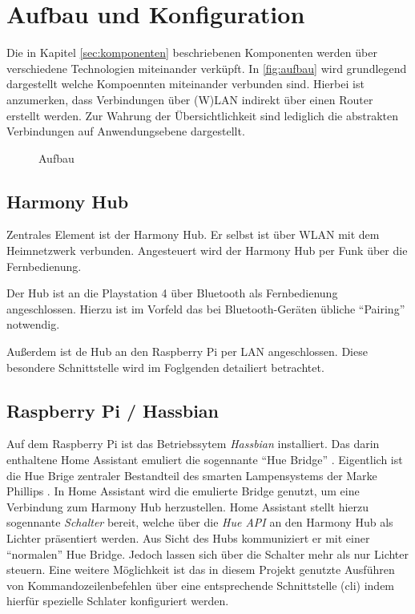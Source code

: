 \newpage
\section{Aufbau und Konfiguration}\label{sec:aufbau}
Die in Kapitel \ref{sec:komponenten} \textit{} beschriebenen Komponenten werden über verschiedene Technologien miteinander verküpft.
In \autoref{fig:aufbau} wird grundlegend dargestellt welche Kompoennten miteinander verbunden sind.
Hierbei ist anzumerken, dass Verbindungen über (W)LAN indirekt über einen Router erstellt werden.
Zur Wahrung der Übersichtlichkeit sind lediglich die abstrakten Verbindungen auf Anwendungsebene dargestellt.

\begin{figure}[ht!]
    \centering
    \resizebox{\textwidth}{!}{
        
    }
    \caption{Aufbau}
    \label{fig:aufbau}
\end{figure}

\subsection{Harmony Hub}\label{sec:aufbau-hub}
Zentrales Element ist der Harmony Hub.
Er selbst ist über WLAN mit dem Heimnetzwerk verbunden.
Angesteuert wird der Harmony Hub per Funk über die Fernbedienung.

Der Hub ist an die Playstation 4 über Bluetooth als Fernbedienung angeschlossen.
Hierzu ist im Vorfeld das bei Bluetooth-Geräten übliche \enquote{Pairing} notwendig.

Außerdem ist de Hub an den Raspberry Pi per LAN angeschlossen.
Diese besondere Schnittstelle wird im Foglgenden detailiert betrachtet.

\subsection{Raspberry Pi / Hassbian}\label{sec:aufbau-hassbian}
Auf dem Raspberry Pi ist das Betriebssytem \textit{Hassbian} installiert.
Das darin enthaltene Home Assistant emuliert die sogennante \enquote{Hue Bridge} \cite{Emulated83:online}.
Eigentlich ist die Hue Brige zentraler Bestandteil des smarten Lampensystems der Marke Phillips \cite{HueBridg65:online}.
In Home Assistant wird die emulierte Bridge genutzt, um eine Verbindung zum Harmony Hub herzustellen.
Home Assistant stellt hierzu sogennante \textit{Schalter} bereit, welche über die \textit{Hue API} an den Harmony Hub als Lichter präsentiert werden.
Aus Sicht des Hubs kommuniziert er mit einer \enquote{normalen} Hue Bridge.
Jedoch lassen sich über die Schalter mehr als nur Lichter steuern.
Eine weitere Möglichkeit ist das in diesem Projekt genutzte Ausführen von Kommandozeilenbefehlen über eine entsprechende Schnittstelle (\ac{cli})
indem hierfür spezielle Schlater konfiguriert werden.

